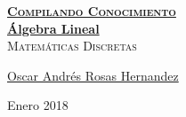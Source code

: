 \documentclass[12pt, fleqn]{report}                             %
\author{Oscar Andrés Rosas}                                     %
\theoremstyle{break}                                            %
\begin{document}
\begin{titlepage}
    
    \pagecolor{TitlePageColor}                                      %
    \color{white}                                                   %

    \vspace                                                         %
    \baselineskip                                                   %

    \makebox[0pt][l]{\rule{1.3\textwidth}{3pt}}                     %
    
    \href{https://compilandoconocimiento.com}                       %
    {\textbf{\textsc{\Huge Compilando Conocimiento}}}\\[2.7cm]      %

    \def\ProjectNameLink{https://github.com/CompilandoConocimiento} %
    \href{\ProjectNameLink/LibroAlgebraLineal}                      %
    {\fontsize{65}{78}\selectfont \textbf{Álgebra Lineal}}\\[0.5cm] %
    \textcolor{ColorSubtext}{\textsc{\Huge Matemáticas Discretas}}  %
    
    \vfill                                                          %
    
    \href{https://compilandoconocimiento.com/yo}                    %
    {\LARGE \textsf{Oscar Andrés Rosas Hernandez}}                  %

    \vspace                                                         %
    \baselineskip                                                   %
    
    {\large \textsf{Enero 2018}}                                    %

\end{titlepage}
\end{document}

